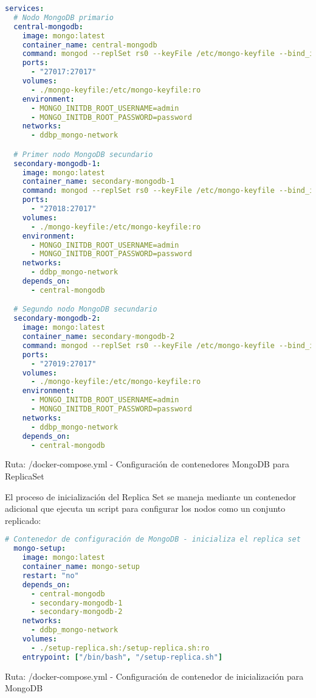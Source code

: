 \documentclass[12pt,letterpaper]{article}
\begin{document}
\begin{lstlisting}[language=yaml]
services:
  # Nodo MongoDB primario
  central-mongodb:
    image: mongo:latest
    container_name: central-mongodb
    command: mongod --replSet rs0 --keyFile /etc/mongo-keyfile --bind_ip_all --auth --port 27017
    ports:
      - "27017:27017"
    volumes:
      - ./mongo-keyfile:/etc/mongo-keyfile:ro
    environment:
      - MONGO_INITDB_ROOT_USERNAME=admin
      - MONGO_INITDB_ROOT_PASSWORD=password
    networks:
      - ddbp_mongo-network

  # Primer nodo MongoDB secundario
  secondary-mongodb-1:
    image: mongo:latest
    container_name: secondary-mongodb-1
    command: mongod --replSet rs0 --keyFile /etc/mongo-keyfile --bind_ip_all --auth --port 27017
    ports:
      - "27018:27017"
    volumes:
      - ./mongo-keyfile:/etc/mongo-keyfile:ro
    environment:
      - MONGO_INITDB_ROOT_USERNAME=admin
      - MONGO_INITDB_ROOT_PASSWORD=password
    networks:
      - ddbp_mongo-network
    depends_on:
      - central-mongodb

  # Segundo nodo MongoDB secundario
  secondary-mongodb-2:
    image: mongo:latest
    container_name: secondary-mongodb-2
    command: mongod --replSet rs0 --keyFile /etc/mongo-keyfile --bind_ip_all --auth --port 27017
    ports:
      - "27019:27017"
    volumes:
      - ./mongo-keyfile:/etc/mongo-keyfile:ro
    environment:
      - MONGO_INITDB_ROOT_USERNAME=admin
      - MONGO_INITDB_ROOT_PASSWORD=password
    networks:
      - ddbp_mongo-network
    depends_on:
      - central-mongodb
\end{lstlisting}
\small{Ruta: /docker-compose.yml - Configuración de contenedores MongoDB para ReplicaSet}

El proceso de inicialización del Replica Set se maneja mediante un contenedor adicional que ejecuta un script para configurar los nodos como un conjunto replicado:

\begin{lstlisting}[language=yaml]
  # Contenedor de configuración de MongoDB - inicializa el replica set
  mongo-setup:
    image: mongo:latest
    container_name: mongo-setup
    restart: "no"
    depends_on:
      - central-mongodb
      - secondary-mongodb-1
      - secondary-mongodb-2
    networks:
      - ddbp_mongo-network
    volumes:
      - ./setup-replica.sh:/setup-replica.sh:ro
    entrypoint: ["/bin/bash", "/setup-replica.sh"]
\end{lstlisting}
\small{Ruta: /docker-compose.yml - Configuración de contenedor de inicialización para MongoDB}
\end{document}
